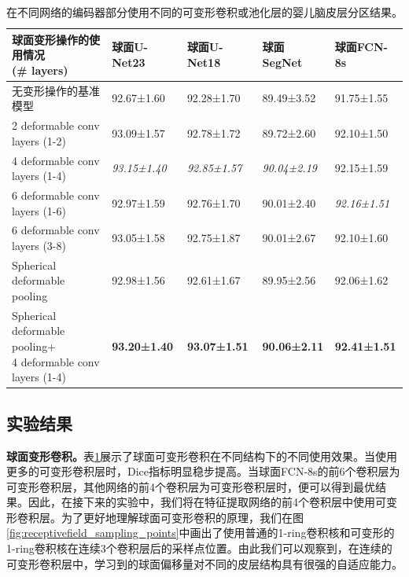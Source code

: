 \begin{table}[t]
		\caption{\label{tab:婴儿数据集分区结果}在不同网络的编码器部分使用不同的可变形卷积或池化层的婴儿脑皮层分区结果。}
		\centering
		\begin{tabularx}{\linewidth}{l|X<{\centering}|X<{\centering}|X<{\centering}|X<{\centering}}
			\hline
			\makecell{球面变形操作的使用情况\\ (\# layers)}& 球面U-Net23      & 球面U-Net18     &  球面SegNet & 球面FCN-8s   \\
			\hline
			无变形操作的基准模型                    &  92.67±1.60            &	92.28±1.70       &  89.49±3.52       	 &		91.75±1.55 \\   
			\hline
			2 deformable conv layers (1-2)           &	93.09±1.57           &	92.78±1.72		 &  89.72±2.60           &	92.10±1.50  \\
			4 deformable conv layers (1-4)           & 	\textit{93.15±1.40}	& \textit{92.85±1.57}	& \textit{90.04±2.19}			&92.15±1.59  \\
			6 deformable conv layers (1-6)           & 	92.97±1.59	&		92.76±1.70	&		90.01±2.40	&		\textit{92.16±1.51} \\
			6 deformable conv layers (3-8) 	         &	93.05±1.58	&		92.75±1.87	&		90.01±2.67		&	92.10±1.60 \\
			\hline
			Spherical deformable pooling            &  	92.98±1.56	&	92.61±1.67	&		89.95±2.56	&		92.06±1.62\\
			\hline
			\makecell{Spherical deformable pooling+\\4 deformable conv layers (1-4)} &	\textbf{93.20±1.40} &	\textbf{93.07±1.51}	& \textbf{90.06±2.11}	&  \textbf{92.41±1.51}	 \\
			\hline 
		\end{tabularx}
\end{table}

\subsection{实验结果}
\textbf{球面变形卷积。}表\ref{tab:婴儿数据集分区结果}展示了球面可变形卷积在不同结构下的不同使用效果。当使用更多的可变形卷积层时，Dice指标明显稳步提高。当球面FCN-8s的前6个卷积层为可变形卷积层，其他网络的前4个卷积层为可变形卷积层时，便可以得到最优结果。因此，在接下来的实验中，我们将在特征提取网络的前4个卷积层中使用可变形卷积层。为了更好地理解球面可变形卷积的原理，我们在图\ref{fig:receptivefield_sampling_points}中画出了使用普通的1-ring卷积核和可变形的1-ring卷积核在连续3个卷积层后的采样点位置。由此我们可以观察到，在连续的可变形卷积层中，学习到的球面偏移量对不同的皮层结构具有很强的自适应能力。

